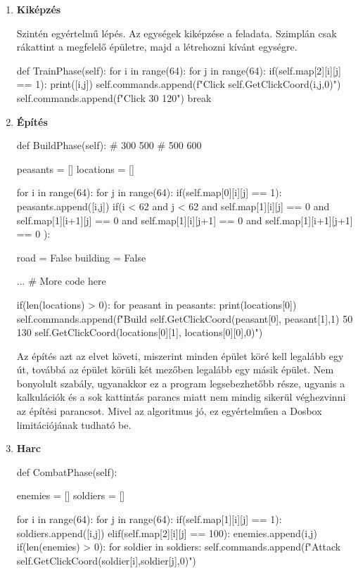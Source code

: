 \begin{enumerate}
    \item \textbf{Kiképzés}
    
Szintén egyértelmű lépés. Az egységek kiképzése a feladata. Szimplán csak rákattint a megfelelő épületre, majd a létrehozni kívánt egységre.
    \begin{python}
def TrainPhase(self):
    for i in range(64):
        for j in range(64):
            if(self.map[2][i][j] == 1):
                print([i,j])
                self.commands.append(f"Click 
                        {self.GetClickCoord(i,j,0)}")
                self.commands.append(f"Click 30 120")
                break
    \end{python}

    \item \textbf{Építés}
    
    \begin{python}
def BuildPhase(self):
# 300 500
# 500 600

peasants = []
locations = []

for i in range(64):
    for j in range(64):
        if(self.map[0][i][j] == 1):
            peasants.append([i,j])
        if(i < 62 and j < 62 and self.map[1][i][j] == 0 and 
        self.map[1][i+1][j] == 0 and 
        self.map[1][i][j+1] == 0 and 
        self.map[1][i+1][j+1] == 0 ):
                    
            road = False
            building = False

            ... # More code here
           
if(len(locations) > 0):
    for peasant in peasants:
            print(locations[0])
            self.commands.append(f"Build 
            {self.GetClickCoord(peasant[0],
            peasant[1],1)} 50 130 
            {self.GetClickCoord(locations[0][1],
            locations[0][0],0)}")

    \end{python}

    Az építés azt az elvet követi, miszerint minden épület köré kell legalább egy út, továbbá az épület körüli két mezőben legalább egy másik épület. Nem bonyolult szabály, ugyanakkor ez a program legsebezhetőbb része, ugyanis a kalkulációk és a sok kattintás parancs miatt nem mindig sikerül véghezvinni az építési parancsot. Mivel az algoritmus jó, ez egyértelműen a Dosbox limitációjának tudható be.

    \item \textbf{Harc}
    
    \begin{python}
def CombatPhase(self):

    enemies = []
    soldiers = []

    for i in range(64):
        for j in range(64):
            if(self.map[1][i][j] == 1):
                soldiers.append([i,j])
            elif(self.map[2][i][j] == 100):
                enemies.append(i,j)
    if(len(enemies) > 0):
        for soldier in soldiers:
            self.commands.append(f"Attack {self.GetClickCoord(soldier[i],soldier[j],0)}")

    \end{python}

\end{enumerate}


